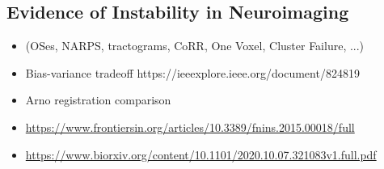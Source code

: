 \subsection{Evidence of Instability in Neuroimaging}
\begin{itemize}
\item (OSes, NARPS, tractograms, CoRR, One Voxel, Cluster Failure, ...)
\item Bias-variance tradeoff https://ieeexplore.ieee.org/document/824819
\item Arno registration comparison
\item \url{https://www.frontiersin.org/articles/10.3389/fnins.2015.00018/full}
\item \url{https://www.biorxiv.org/content/10.1101/2020.10.07.321083v1.full.pdf}
\end{itemize}

